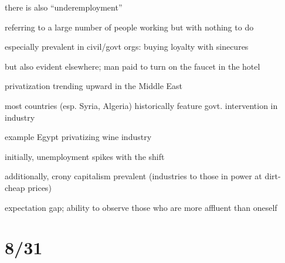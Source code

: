 \documentclass[12pt]{article}
\begin{document}
\noindent
there is also ``underemployment''

referring to a large number of people working but with nothing to do

especially prevalent in civil/govt orgs: buying loyalty with sinecures

but also evident elsewhere; man paid to turn on the faucet in the hotel

\noindent
privatization trending upward in the Middle East

most countries (esp. Syria, Algeria) historically feature govt. intervention in industry

example Egypt privatizing wine industry

initially, unemployment spikes with the shift

additionally, crony capitalism prevalent (industries to those in power at dirt-cheap prices)

expectation gap; ability to observe those who are more affluent than oneself

\section{8/31}
\end{document}
